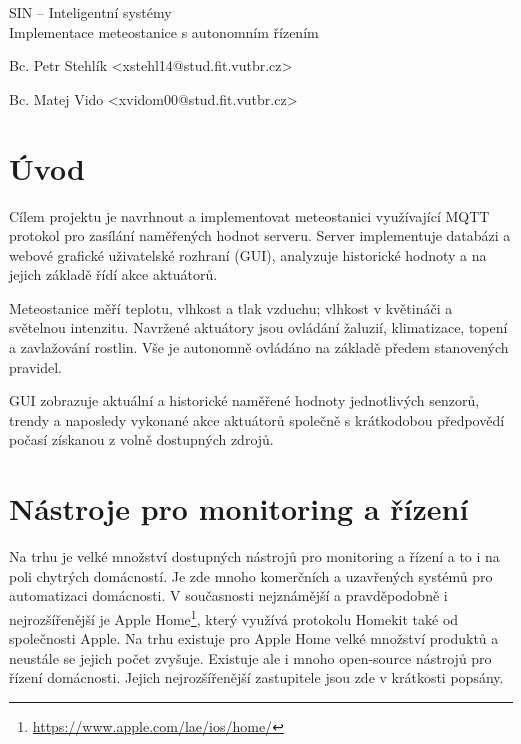 \documentclass[11pt,a4paper]{article}
\begin{document}
\begin{center}
	\LARGE{SIN -- Inteligentní systémy}\\
	\Large{Implementace meteostanice s autonomním řízením}
	\vspace{0.5cm}

    \begin{centering}
        \small{Bc. Petr Stehlík <xstehl14@stud.fit.vutbr.cz>}
    \end{centering}

    \begin{centering}
        \small{Bc. Matej Vido <xvidom00@stud.fit.vutbr.cz>}
    \end{centering}

	\vspace{0.2cm}

\end{center}

\section{Úvod}
Cílem projektu je navrhnout a implementovat meteostanici využívající MQTT protokol pro zasílání naměřených hodnot serveru. Server implementuje databázi a webové grafické uživatelské rozhraní (GUI), analyzuje historické hodnoty a na jejich základě řídí akce aktuátorů.

Meteostanice měří teplotu, vlhkost a tlak vzduchu; vlhkost v květináči a světelnou intenzitu. Navržené aktuátory jsou ovládání žaluzií, klimatizace, topení a zavlažování rostlin. Vše je autonomně ovládáno na základě předem stanovených pravidel.

GUI zobrazuje aktuální a historické naměřené hodnoty jednotlivých senzorů, trendy a naposledy vykonané akce aktuátorů společně s krátkodobou předpovědí počasí získanou z volně dostupných zdrojů.

\section{Nástroje pro monitoring a řízení}
Na trhu je velké množství dostupných nástrojů pro monitoring a řízení a to i na poli chytrých domácností. Je zde mnoho komerčních a uzavřených systémů pro automatizaci domácnosti. V současnosti nejznámější a pravděpodobně i nejrozšířenější je Apple Home\footnote{\url{https://www.apple.com/lae/ios/home/}}, který využívá protokolu Homekit také od společnosti Apple. Na trhu existuje pro Apple Home velké množství produktů a neustále se jejich počet zvyšuje. Existuje ale i mnoho open-source nástrojů pro řízení domácnosti. Jejich nejrozšířenější zastupitele jsou zde v krátkosti popsány.
\end{document}
